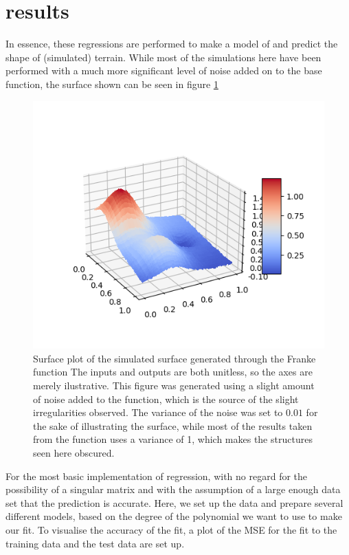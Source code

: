 \documentclass[15pt comic sans]{revtex4-2}
\begin{document}
\section{results}

In essence, these regressions are performed to make a model of and predict the shape of
(simulated) terrain. While most of the simulations here have been performed with a
much more significant level of noise added on to the base function, the surface shown
can be seen in figure \ref{fig:FrankeSurface}

\begin{figure}[hbtp]
\includegraphics[scale=0.7]{../plots/surfaceplotfrankeSigma01.png}
\caption{Surface plot of the simulated surface generated through the Franke function
	The inputs and outputs are both unitless, so the axes are merely ilustrative. 
	This figure was generated using a slight amount of noise added to the function, 
	which is the source of the slight irregularities observed. The variance of the 
	noise was set to $0.01$ for the sake of illustrating the surface, while most of the 
	results taken from the function uses a variance of 1, which makes the structures 
	seen here obscured.}
\label{fig:FrankeSurface}
\end{figure}

For the most basic implementation of regression, with no regard for the possibility of a
singular matrix and with the assumption of a large enough data set that the prediction 
is accurate. Here, we set up the data and prepare several different models, based on the
degree of the polynomial we want to use to make our fit. To visualise the accuracy of 
the fit, a plot of the MSE for the fit to the training data and the test data are set up.
\end{document}
